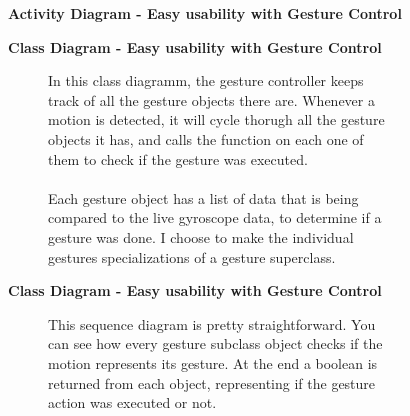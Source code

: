 \documentclass{article}
\begin{document}
		\begin{figure}[htbp]
			\centering
			\textbf{Activity Diagram - Easy usability with Gesture Control}
			\begin{subfigure}{\textwidth}
				\resizebox{\textwidth}{!}{}
			\end{subfigure}
			\begin{subfigure}{\textwidth}
			\end{subfigure}
		\end{figure}
		\clearpage

		\begin{figure}[htbp]
			\centering
			\textbf{Class Diagram - Easy usability with Gesture Control}
			\begin{subfigure}{\textwidth}
				\resizebox{\textwidth}{!}{}
			\end{subfigure}
			\begin{subfigure}{\textwidth}
				\vspace{1em}
				In this class diagramm, the gesture controller keeps track of all the gesture objects there are.
				Whenever a motion is detected, it will cycle thorugh all the gesture objects it has, and calls the function on each one
				of them to check if the gesture was executed.
				\\ \\
				Each gesture object has a list of data that is being compared to the live gyroscope data, to determine if a gesture was done.
				I choose to make the individual gestures specializations of a gesture superclass.
			\end{subfigure}
		\end{figure}
		\clearpage

		\begin{figure}[htbp]
			\centering
			\textbf{Class Diagram - Easy usability with Gesture Control}
			\begin{subfigure}{\textwidth}
				\resizebox{\textwidth}{!}{}
			\end{subfigure}
			\begin{subfigure}{\textwidth}
				\vspace{1em}
				This sequence diagram is pretty straightforward. You can see how every gesture subclass object checks if the motion
				represents its gesture. At the end a boolean is returned from each object, representing if the gesture action was executed or not.
			\end{subfigure}
		\end{figure}
		\clearpage
	
\end{document}
